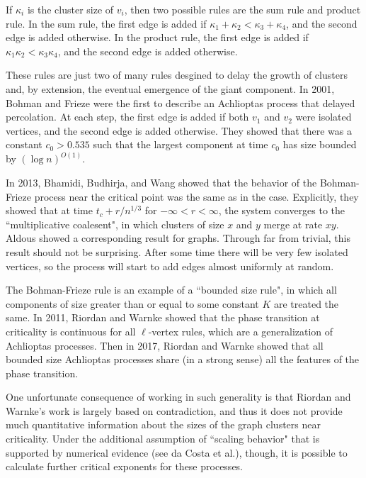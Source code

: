 \documentclass[twoside,10pt]{article}
\begin{document}
If $\kappa_i$ is the cluster size of $v_{i}$, then two possible rules are the sum rule and product rule. In the sum rule, the first edge is added if $\kappa_1+\kappa_2 < \kappa_3+\kappa_4$, and the second edge is added otherwise. In the product rule, the first edge is added if $\kappa_1 \kappa_2 < \kappa_3 \kappa_4$, and the second edge is added otherwise.

These rules are just two of many rules desgined to delay the growth of clusters and, by extension, the eventual emergence of the giant component. In 2001, Bohman and Frieze were the first to describe an Achlioptas process that delayed percolation.\autocite{BF} At each step, the first edge is added if both $v_1$ and $v_2$ were isolated vertices, and the second edge is added otherwise. They showed that there was a constant $c_0>0.535$ such that the largest component at time $c_0$ has size bounded by $(\log n)^{O(1)}$.

In 2013, Bhamidi, Budhirja, and Wang showed that the behavior of the Bohman-Frieze process near the critical point was the same as in the \ER case.\autocite{coal} Explicitly, they showed that at time $t_c + r/n^{1/3}$ for $-\infty<r<\infty$, the system converges to the ``multiplicative coalesent", in which clusters of size $x$ and $y$ merge at rate $xy$. Aldous showed a corresponding result for \ER graphs.\autocite{Aldous} Through far from trivial, this result should not be surprising. After some time there will be very few isolated vertices, so the process will start to add edges almost uniformly at random.

The Bohman-Frieze rule is an example of a ``bounded size rule", in which all components of size greater than or equal to some constant $K$ are treated the same. In 2011, Riordan and Warnke showed that the phase transition at criticality is continuous for all $\ell$-vertex rules,\autocite{RW-cont} which are a generalization of Achlioptas processes. Then in 2017, Riordan and Warnke showed that all bounded size Achlioptas processes share (in a strong sense) all the features of the \ER phase transition.\autocite{RW-bounded}

One unfortunate consequence of working in such generality is that Riordan and Warnke's work is largely based on contradiction, and thus it does not provide much quantitative information about the sizes of the graph clusters near criticality. Under the additional assumption of ``scaling behavior" that is supported by numerical evidence (see da Costa et al.\autocite{daCosta}), though, it is possible to calculate further critical exponents for these processes.
\end{document}
